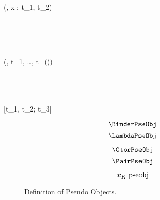 
\Rule{\BinderPseObj}
    {
         \\
         \\
    }
    {(\kappa, x : t_1, t_2) \pseobj}
    {}

\Rule{\LambdaPseObj}
    {
         \\
         \\
    }
    { \pseobj}
    {}

\Rule{\CtorPseObj}
    {
         \\
    }
    {(\kappa, t_1, \ldots, t_{(\kappa)}) \pseobj}
    {}

\Rule{\PairPseObj}
    {
         \\
         \\
         \\
    }
    {[t_1, t_2; t_3] \pseobj}
    {}

\begin{figure}
    \centering
    \begin{minipage}{0.5\textwidth}
        $$\BinderPseObj$$
        $$\LambdaPseObj$$
    \end{minipage}%
    \begin{minipage}{0.5\textwidth}
        $$\CtorPseObj$$
        $$\PairPseObj$$
    \end{minipage}%
    $$x_K ~\mbox{\normalfont pseobj}$$
    \caption{Definition of Pseudo Objects.}
    \label{fig:2:pseobj}
\end{figure}
